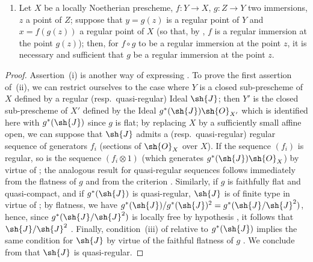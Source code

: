 \begin{proposition}[19.1.5]
\begin{enumerate}[label=(\roman*)]
\begin{enumerate}[label=\emph{\alph*)}]
  \end{enumerate}
  \item Let $X$ be a locally Noetherian prescheme, $f:Y\to X$, $g:Z\to Y$ two immersions, $z$ a point of $Z$; suppose that $y=g(z)$ is a regular point of $Y$ and $x=f(g(z))$ a regular point
of $X$ (so that, by , $f$ is a regular immersion at the point $g(z)$); then,
for $f\circ g$ to be a regular immersion at the point $z$, it is necessary and sufficient that $g$ be a regular immersion at the point $z$.
\end{enumerate}
\end{proposition}

\begin{proof}
Assertion~(i) is another way of expressing .
To prove the first assertion of~(ii), we can restrict ourselves to the case where $Y$ is a closed sub-prescheme of $X$ defined by a regular (resp.\ quasi-regular) Ideal $\sh{J}$; then $Y'$ is the closed sub-prescheme of $X'$ defined by the Ideal $g^*(\sh{J})\sh{O}_{X'}$ which is identified here with $g^*(\sh{J})$ since $g$ is flat; by replacing $X$ by a sufficiently small affine open, we can suppose that $\sh{J}$ admits a (resp.\ quasi-regular) regular sequence of generators $f_i$ (sections of $\sh{O}_X$ over $X$).
If the sequence $(f_i)$ is regular, so is the sequence $(f_i\otimes 1)$ (which generates $g^*(\sh{J})\sh{O}_X$) by virtue of ; the analogous result for quasi-regular sequences follows immediately from the flatness of $g$ and from the criterion .
Similarly, if $g$ is faithfully flat and quasi-compact, and if $g^*(\sh{J})$ is quasi-regular, $\sh{J}$ is of finite type in virtue of ; by flatness, we have $g^*(\sh{J})/g^*(\sh{J})^2=g^*(\sh{J}/\sh{J}^2)$, hence, since $g^*(\sh{J}/\sh{J}^2)$ is locally free by hypothesis , it follows that $\sh{J}/\sh{J}^2$ .
Finally, condition~(iii) of  relative to $g^*(\sh{J})$ implies the same condition for $\sh{J}$ by virtue of the faithful flatness of $g$ .
We conclude from  that $\sh{J}$ is quasi-regular.


\end{proof}

